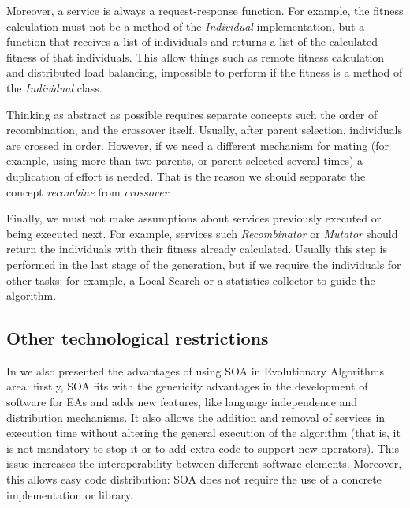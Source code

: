 \documentclass{sig-alternate}
\begin{document}
Moreover, a service is always a request-response function. For example, the fitness calculation must not be a method of the {\em Individual} implementation, but a function that receives a list of individuals and returns a list of the calculated fitness of that individuals. This allow things such as remote fitness calculation and distributed load balancing, impossible to perform if the fitness is a method of the {\em Individual} class.



Thinking as abstract as possible requires separate concepts such the order of recombination, and the crossover itself. Usually, after parent selection, individuals are crossed in order. However, if we need a different mechanism for mating (for example, using more than two parents, or parent selected several times) a duplication of effort is needed. That is the reason we should sepparate the concept {\em recombine} from {\em crossover}. 

Finally, we must not make assumptions about services previously executed or being executed next. For example, services such {\em Recombinator} or {\em Mutator} should return the individuals with their fitness already calculated. Usually this step is performed in the last stage of the generation, but if we require the individuals for other tasks: for example, a Local Search or a statistics collector to guide the algorithm.

\subsection{Other technological restrictions}

In \cite{OSGILIATH} we also presented the advantages of using SOA in Evolutionary Algorithms area: firstly, SOA fits with the genericity advantages in the development of software for EAs \cite{GENERICITY05} and adds new features, like language independence and  distribution mechanisms. It also allows the addition and removal of services in execution time without altering the general execution of the algorithm (that is, it is not mandatory to stop it or to add extra code to support new operators). This issue increases the interoperability between different software elements. Moreover, this allows easy code distribution: SOA does not require the use of a concrete implementation or library.
\end{document}
